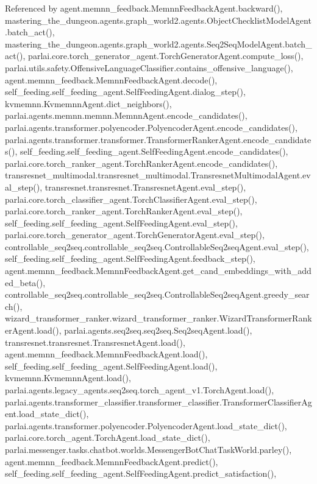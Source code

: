 Referenced by agent.\+memnn\+\_\+feedback.\+Memnn\+Feedback\+Agent.\+backward(), mastering\+\_\+the\+\_\+dungeon.\+agents.\+graph\+\_\+world2.\+agents.\+Object\+Checklist\+Model\+Agent.\+batch\+\_\+act(), mastering\+\_\+the\+\_\+dungeon.\+agents.\+graph\+\_\+world2.\+agents.\+Seq2\+Seq\+Model\+Agent.\+batch\+\_\+act(), parlai.\+core.\+torch\+\_\+generator\+\_\+agent.\+Torch\+Generator\+Agent.\+compute\+\_\+loss(), parlai.\+utils.\+safety.\+Offensive\+Language\+Classifier.\+contains\+\_\+offensive\+\_\+language(), agent.\+memnn\+\_\+feedback.\+Memnn\+Feedback\+Agent.\+decode(), self\+\_\+feeding.\+self\+\_\+feeding\+\_\+agent.\+Self\+Feeding\+Agent.\+dialog\+\_\+step(), kvmemnn.\+Kvmemnn\+Agent.\+dict\+\_\+neighbors(), parlai.\+agents.\+memnn.\+memnn.\+Memnn\+Agent.\+encode\+\_\+candidates(), parlai.\+agents.\+transformer.\+polyencoder.\+Polyencoder\+Agent.\+encode\+\_\+candidates(), parlai.\+agents.\+transformer.\+transformer.\+Transformer\+Ranker\+Agent.\+encode\+\_\+candidates(), self\+\_\+feeding.\+self\+\_\+feeding\+\_\+agent.\+Self\+Feeding\+Agent.\+encode\+\_\+candidates(), parlai.\+core.\+torch\+\_\+ranker\+\_\+agent.\+Torch\+Ranker\+Agent.\+encode\+\_\+candidates(), transresnet\+\_\+multimodal.\+transresnet\+\_\+multimodal.\+Transresnet\+Multimodal\+Agent.\+eval\+\_\+step(), transresnet.\+transresnet.\+Transresnet\+Agent.\+eval\+\_\+step(), parlai.\+core.\+torch\+\_\+classifier\+\_\+agent.\+Torch\+Classifier\+Agent.\+eval\+\_\+step(), parlai.\+core.\+torch\+\_\+ranker\+\_\+agent.\+Torch\+Ranker\+Agent.\+eval\+\_\+step(), self\+\_\+feeding.\+self\+\_\+feeding\+\_\+agent.\+Self\+Feeding\+Agent.\+eval\+\_\+step(), parlai.\+core.\+torch\+\_\+generator\+\_\+agent.\+Torch\+Generator\+Agent.\+eval\+\_\+step(), controllable\+\_\+seq2seq.\+controllable\+\_\+seq2seq.\+Controllable\+Seq2seq\+Agent.\+eval\+\_\+step(), self\+\_\+feeding.\+self\+\_\+feeding\+\_\+agent.\+Self\+Feeding\+Agent.\+feedback\+\_\+step(), agent.\+memnn\+\_\+feedback.\+Memnn\+Feedback\+Agent.\+get\+\_\+cand\+\_\+embeddings\+\_\+with\+\_\+added\+\_\+beta(), controllable\+\_\+seq2seq.\+controllable\+\_\+seq2seq.\+Controllable\+Seq2seq\+Agent.\+greedy\+\_\+search(), wizard\+\_\+transformer\+\_\+ranker.\+wizard\+\_\+transformer\+\_\+ranker.\+Wizard\+Transformer\+Ranker\+Agent.\+load(), parlai.\+agents.\+seq2seq.\+seq2seq.\+Seq2seq\+Agent.\+load(), transresnet.\+transresnet.\+Transresnet\+Agent.\+load(), agent.\+memnn\+\_\+feedback.\+Memnn\+Feedback\+Agent.\+load(), self\+\_\+feeding.\+self\+\_\+feeding\+\_\+agent.\+Self\+Feeding\+Agent.\+load(), kvmemnn.\+Kvmemnn\+Agent.\+load(), parlai.\+agents.\+legacy\+\_\+agents.\+seq2seq.\+torch\+\_\+agent\+\_\+v1.\+Torch\+Agent.\+load(), parlai.\+agents.\+transformer\+\_\+classifier.\+transformer\+\_\+classifier.\+Transformer\+Classifier\+Agent.\+load\+\_\+state\+\_\+dict(), parlai.\+agents.\+transformer.\+polyencoder.\+Polyencoder\+Agent.\+load\+\_\+state\+\_\+dict(), parlai.\+core.\+torch\+\_\+agent.\+Torch\+Agent.\+load\+\_\+state\+\_\+dict(), parlai.\+messenger.\+tasks.\+chatbot.\+worlds.\+Messenger\+Bot\+Chat\+Task\+World.\+parley(), agent.\+memnn\+\_\+feedback.\+Memnn\+Feedback\+Agent.\+predict(), self\+\_\+feeding.\+self\+\_\+feeding\+\_\+agent.\+Self\+Feeding\+Agent.\+predict\+\_\+satisfaction(), 